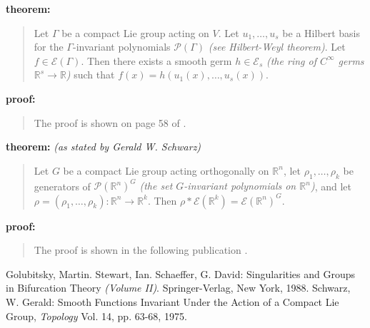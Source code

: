 \documentclass[12pt]{article}
\begin{document}
\textbf{theorem:}
\begin{quote}
Let $\Gamma$ be a compact Lie group acting on $V$.  Let $u_1,\ldots ,u_s$ be a Hilbert basis for the $\Gamma$-invariant polynomials $\mathcal{P}(\Gamma )$ \textit{(see Hilbert-Weyl theorem)}.  Let $f\in \mathcal{E}(\Gamma )$.  Then there exists a smooth germ $h\in \mathcal{E}_s$ \textit{(the ring of $C^{\infty}$ germs $\mathbb{R}^s \to \mathbb{R}$)} such that $f(x) = h(u_1(x),\ldots , u_s(x))$. \cite{1}
\end{quote}
\textbf{proof:}
\begin{quote}
The proof is shown on page 58 of \cite{1}.
\end{quote}
\textbf{theorem:} \textit{(as stated by Gerald W. Schwarz)}
\begin{quote}
Let $G$ be a compact Lie group acting orthogonally on $\mathbb{R}^n$, let $\rho_1 ,\ldots, \rho_k$ be generators of $\mathcal{P}(\mathbb{R}^n)^G$ \textit{(the set $G$-invariant polynomials on $\mathbb{R}^n$)}, and let $\rho = (\rho_1 ,\ldots, \rho_k):\mathbb{R}^n \to \mathbb{R}^k$.  Then $\rho*\mathcal{E}(\mathbb{R}^k) = \mathcal{E}(\mathbb{R}^n)^G$. \cite{2}
\end{quote}
\textbf{proof:}
\begin{quote}
The proof is shown in the following publication \cite{2}.
\end{quote}
\begin{thebibliography}{2}
 Golubitsky, Martin. Stewart, Ian. Schaeffer, G. David: Singularities and Groups in Bifurcation Theory \textit{(Volume II)}. Springer-Verlag, New York, 1988.
 Schwarz, W. Gerald: Smooth Functions Invariant Under the Action of a Compact Lie Group, \textit{Topology} Vol. 14, pp. 63-68, 1975.
\end{thebibliography}
\end{document}
